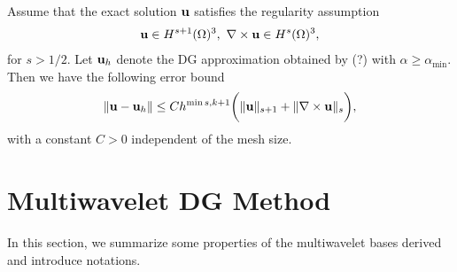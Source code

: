 \documentclass[final,leqno]{siamltex704}
\newcommand{\bn}{{\bf n}}
\def\bn{{\bf n}}
\def\bu{{\bf u}}
\def\bE{{\bf E}}
\def\bB{{\bf B}}
\begin{document}
\begin{theorem}
Assume that the exact solution $\bu$ satisfies the regularity assumption
\begin{eqnarray}
\bu\in H^{s+1}(\Omega)^3,\ \nabla\times\bu\in H^s(\Omega)^3,
\end{eqnarray}
for $s>1/2$. Let $\bu_h$ denote the DG approximation obtained by (?) with $\alpha\ge\alpha_{\min}$. Then we have the following error bound
\begin{eqnarray}
\|\bu-\bu_h\|\le Ch^{\min{s,k}+1}\bigg(\|\bu\|_{s+1}+\|\nabla\times\bu\|_s\bigg),
\end{eqnarray}
with a constant $C>0$ independent of the mesh size.
\end{theorem}

%


\section{Multiwavelet DG Method}
In this section, we summarize some properties of the multiwavelet bases derived and introduce notations. 
\end{document}
